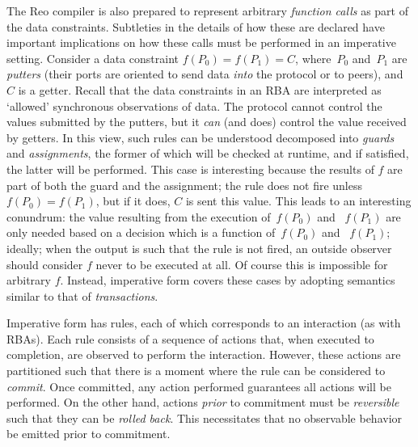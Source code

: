 The Reo compiler is also prepared to represent arbitrary \textit{function calls} as part of the data constraints. Subtleties in the details of how these are declared have important implications on how these calls must be performed in an imperative setting. Consider a data constraint $f(P_0)=f(P_1)=C$, where~$P_0$ and~$P_1$ are \textit{putters} (their ports are oriented to send data \textit{into} the protocol or to peers), and $C$ is a getter. Recall that the data constraints in an RBA are interpreted as `allowed' synchronous observations of data. The protocol cannot control the values submitted by the putters,  but it \textit{can} (and does) control the value received by getters. In this view, such rules can be understood decomposed into \textit{guards} and \textit{assignments}, the former of which will be checked at runtime, and if satisfied, the latter will be performed. This case is interesting because the results of $f$ are part of both the guard and the assignment; the rule does not fire unless $f(P_0)=f(P_1)$, but if it does, $C$ is sent this value. This leads to an interesting conundrum: the value resulting from the execution of~$f(P_0)$ and ~$f(P_1)$ are only needed based on a decision which is a function of~$f(P_0)$ and ~$f(P_1)$; ideally; when the output is such that the rule is not fired, an outside observer should consider $f$ never to be executed at all. Of course this is impossible for arbitrary $f$. Instead, imperative form covers these cases by adopting semantics similar to that of \textit{transactions}.

Imperative form has rules, each of which corresponds to an interaction (as with RBAs). Each rule consists of a sequence of actions that, when executed to completion, are observed to perform the interaction. However, these actions are partitioned such that there is a moment where the rule can be considered to \textit{commit}. Once committed, any action performed guarantees all actions will be performed. On the other hand, actions \textit{prior} to commitment must be \textit{reversible} such that they can be \textit{rolled back}. This necessitates that no observable behavior be emitted prior to commitment.

